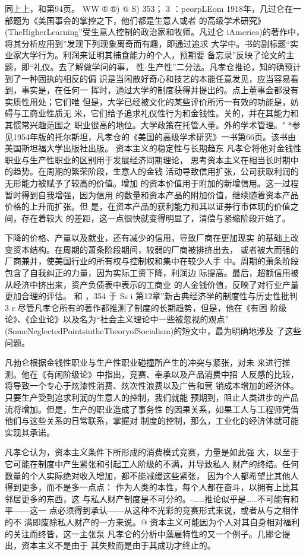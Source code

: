 同上上，和第94页。
WW
®
®)
@
S)
353；
3
：peorpLEom
1918年，几过仑在一部题为《美国事会的掌控之下，他们都是生意人或者
的高级学术研究》(TheHigherLearning”受生意人控制的政治家和牧师。凡过仑
iAmerica)的著作中，将其分析应用到”发现下列现象离奇而有趣，即通过追求
大学中。书的副标题“实业家大学行为。利润来证明其捕食能力的个人，预期要
备忘录”反映了论文的主题，即“礼仪。去了解做学问的事，
性-生产性”二分法。凡孝仓推论，知的确预计到了一种固执的相反的偏
识是当闲散好奇心和技艺的本能任意发见，应当容易看到，事实是，在任何一
挥时，通过大学的制度获得并提出的。点上董事会都没有实质性用处；它们唯
但是，大学已经被文化的某些评价所污一有效的功能是，妨碍与工商业性质无
米，它们给予追求礼仪性行为和金钱性。关的，并在其能力和其惯常兴趣范围之
职业很高的地位。大学政策在托管人董。外的学术管理。"
*参见1954年版的托尔斯坦，凡孝仓的《美国的高级学术研究》一书第66页。该书由
美国斯坦福大学出版社出版。
资本主义的稳定性与长期趋东
凡孝仑将他对金钱性职业与生产性职业的区别用于发展经济同期理论，
思考资本主义在相当长时期中的趋势。在周期的繁荣阶段，生意人的金钱
活动导致信用扩张，公司获取利润的无形能力被赋予了较高的价值。增加
的资本价值用于附加的新增信用。这一过程暂时得到自我增强，因为信用
的数量和资本产品的附加价值，继续随着资本产品价格的上升而扩张。但
是，在资本产品的获利能力和其以证券行市体现的价值之间，存在着较大
的差距，这一点很快就变得明显了，清偿与紧缩阶段开始了。

下降的价格、产量以及就业，还有减少的信用，导致厂商在更加现实
的基础上改变资本结构。在周期的萧条阶段期间，较弱的厂商被排挤出去，
或者被大而强的厂商兼并，使美国行业的所有权与控制权和集中在较少人手
中。周期的萧条阶段包含了自我纠正的力量，因为实际工资下降，利润边
际提高。最后，超额信用被从经济中挤出来，资产负债表中表示的工商业
的人金钱价值，反映了对行业产量更加合理的评估。
和
，354
于
Ss
i
第12章”新古典经济学的制度性与历史性批判
3
r
尽管凡孝仑所有的著作都推测了制度的长期趋势，但是，他在《有困
阶级论》、《企业论》以及名为“社会主义理论中一些被忽视的观点”
(SomeNeglectedPointsintheTheoryofSocialism)的短文中，最为明确地涉及
了这些问题。

凡勃仑根据金钱性职业与生产性职业碰撞所产生的冲突与紧张，对未
来进行推测。他在《有闲阶级论》中指出，竞赛、奉承以及产品消费中招
人反感的比较，将导致一个专心于炫漆性消费、炫次性浪费以及广告和营
销成本增加的经济体。只要生产受到追求利润的生意人的控制，我们就能
预期到，阻止人类进步的产品流将增加。但是，生产的职业造成了事务性
的因果关系，如果工人与工程师凭借他们与这些关系的日常联系，掌握对
制度的控制，那么，工业化的经济体就可能实现其承诺。

凡孝仑认为，资本主义条件下所形成的消费模式竞赛，力量是如此强
大，以至于它可能在制度中产生紧张和引起工人阶级的不满，并导致私人
财产的终结。任何数量的个人实际绝对收入增加，都不能减缓这些紧张，
因为个人都希望比其他人得到更多，而不是多一点点：
作为人类的本性，每个人都在奋斗，以拥有上比其邻居更多的东西，这
与私人财产制度是不可分的。-……推论似乎是……不可能有和平——这一
点必须得到承认——从这种不光彩的竞赛形式来说，或者从与之相伴的不
满即废除私人财产的一方来说。@
资本主义可能因为个人对其自身相对福利的关注而终皆，这一主张泵
凡孝仑的分析中藻雇特性的又一个例子。几邯仑提出，资本主义不是由于
其失败而是由于其成功才终止的。

